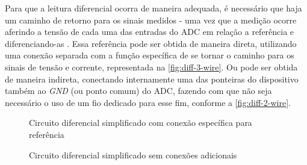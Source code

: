 Para que a leitura diferencial ocorra de maneira adequada, é necessário que haja um caminho de retorno para os sinais medidos - uma vez que a medição ocorre aferindo a tensão de cada uma das entradas do \gls{ADC} em relação a referência e diferenciando-as \cite{mediff}.
Essa referência pode ser obtida de maneira direta, utilizando uma conexão separada com a função específica de se tornar o caminho para os sinais de tensão e corrente, representada na \autoref{fig:diff-3-wire}. Ou pode ser obtida de maneira indireta, conectando internamente uma das ponteiras do dispositivo também ao \textit{GND} (ou ponto comum) do \gls{ADC}, fazendo com que não seja necessário o uso de um fio dedicado para esse fim, conforme a \autoref{fig:diff-2-wire}.

\begin{figure}[htb!]
    \caption{Circuito diferencial simplificado com conexão específica para referência}
    \label{fig:diff-3-wire}
    \fonte{}
\end{figure}

\begin{figure}[htb!]
    \caption{Circuito diferencial simplificado sem conexões adicionais}
    \label{fig:diff-2-wire}
    \fonte{}
\end{figure}

